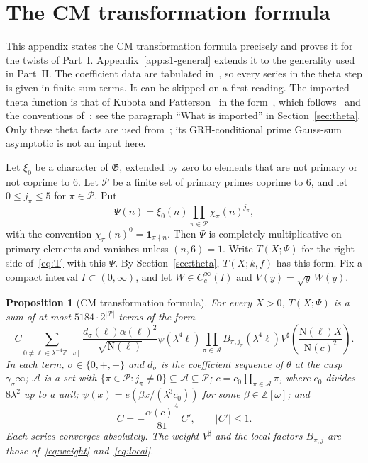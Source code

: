 \documentclass[11pt]{article}
\numberwithin{equation}{section}
\newcommand{\OO}{\mathbb Z[\omega]}
\newcommand{\N}{\mathrm N}
\newcommand{\ind}{\mathbf1}
\newtheorem{proposition}{Proposition}
\begin{document}
\appendix
\section{The CM transformation formula}\label{app:reflection}

This appendix states the CM transformation formula precisely and proves it for the twists of Part~I.
Appendix~\ref{app:s1-general} extends it to the generality used in Part~II.
The coefficient data are tabulated in~\cite[Theorem~23]{QF}, so every
series in the theta step is given in finite-sum terms. It can be skipped on a first reading. The
imported theta function is that of Kubota and Patterson~\cite{Kub69,Pat77} in the
form~\cite[Theorem~23]{QF}, which follows~\cite[Section~5.1 and
Appendix]{DR} and the conventions of~\cite{OAI1112}; see the paragraph
``What is imported'' in Section~\ref{sec:theta}.
Only these theta facts are used from~\cite{DR}; its GRH-conditional
prime Gauss-sum asymptotic is not an input here.

Let $\xi_0$ be a character of $\mathfrak G$, extended by zero to
elements that are not primary or not coprime to $6$. Let $\mathcal P$ be
a finite set of primary primes coprime to $6$, and let $0\le j_\pi\le5$
for $\pi\in\mathcal P$. Put
\begin{equation}\label{eq:d096}
 \Psi(n)=\xi_0(n)\prod_{\pi\in\mathcal P}\chi_\pi(n)^{j_\pi},
\end{equation}
with the convention $\chi_\pi(n)^0=\ind_{\pi\nmid n}$. Then $\Psi$ is
completely multiplicative on primary elements and vanishes unless
$(n,6)=1$. Write $T(X;\Psi)$ for the right side of~\eqref{eq:T} with this
$\Psi$. By Section~\ref{sec:theta}, $T(X;k,f)$ has this form. Fix a
compact interval $I\subset(0,\infty)$, and let $W\in C_c^\infty(I)$ and
$V(y)=\sqrt y\,W(y)$.

\begin{proposition}[CM transformation formula]\label{prop:b3-reflection}
For every $X>0$, $T(X;\Psi)$ is a sum of at most
$5184\cdot2^{|\mathcal P|}$ terms of the form
\begin{equation}\label{eq:reflection}
 C\sum_{0\ne\ell\in\lambda^{-4}\OO}
 \frac{d_\sigma(\ell)\alpha(\ell)^2}{\sqrt{\N(\ell)}}
 \psi(\lambda^4\ell)\prod_{\pi\in\mathcal A}B_{\pi,j_\pi}(\lambda^4\ell)
 V^\sharp\left(\frac{\N(\ell)X}{\N(c)^2}\right).
\end{equation}
In each term, $\sigma\in\{0,+,-\}$ and $d_\sigma$ is the coefficient
sequence of $\overline\theta$ at the cusp $\gamma_\sigma\infty$;
$\mathcal A$ is a set with
$\{\pi\in\mathcal P:j_\pi\ne0\}\subseteq\mathcal A\subseteq\mathcal P$;
$c=c_0\prod_{\pi\in\mathcal A}\pi$, where $c_0$ divides $8\lambda^2$ up to
a unit; $\psi(x)=e(\beta x/(\lambda^3c_0))$ for some $\beta\in\OO$; and
\begin{equation}\label{eq:d097}
 C=-\frac{\overline{\alpha(c)}^{\,4}}{81}\,C',\qquad|C'|\le1.
\end{equation}
Each series converges absolutely. The weight $V^\sharp$ and the local
factors $B_{\pi,j}$ are those of~\eqref{eq:weight} and~\eqref{eq:local}.
\end{proposition}
\end{document}
